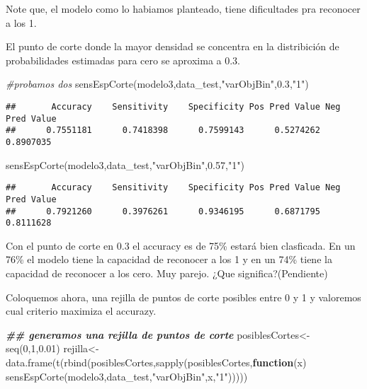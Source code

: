 \documentclass[
]{article}
\newenvironment{Shaded}{\begin{snugshade}}{\end{snugshade}}
\newcommand{\CommentTok}[1]{\textcolor[rgb]{0.56,0.35,0.01}{\textit{#1}}}
\newcommand{\ControlFlowTok}[1]{\textcolor[rgb]{0.13,0.29,0.53}{\textbf{#1}}}
\newcommand{\DecValTok}[1]{\textcolor[rgb]{0.00,0.00,0.81}{#1}}
\newcommand{\DocumentationTok}[1]{\textcolor[rgb]{0.56,0.35,0.01}{\textbf{\textit{#1}}}}
\newcommand{\FloatTok}[1]{\textcolor[rgb]{0.00,0.00,0.81}{#1}}
\newcommand{\FunctionTok}[1]{\textcolor[rgb]{0.00,0.00,0.00}{#1}}
\newcommand{\NormalTok}[1]{#1}
\newcommand{\OtherTok}[1]{\textcolor[rgb]{0.56,0.35,0.01}{#1}}
\newcommand{\StringTok}[1]{\textcolor[rgb]{0.31,0.60,0.02}{#1}}
\begin{document}
Note que, el modelo como lo habiamos planteado, tiene dificultades pra
reconocer a los 1.

El punto de corte donde la mayor densidad se concentra en la
distribición de probabilidades estimadas para cero se aproxima a 0.3.

\begin{Shaded}
\begin{Highlighting}[]
\CommentTok{\#probamos dos}
\FunctionTok{sensEspCorte}\NormalTok{(modelo3,data\_test,}\StringTok{"varObjBin"}\NormalTok{,}\FloatTok{0.3}\NormalTok{,}\StringTok{"1"}\NormalTok{)}
\end{Highlighting}
\end{Shaded}

\begin{verbatim}
##       Accuracy    Sensitivity    Specificity Pos Pred Value Neg Pred Value 
##      0.7551181      0.7418398      0.7599143      0.5274262      0.8907035
\end{verbatim}

\begin{Shaded}
\begin{Highlighting}[]
\FunctionTok{sensEspCorte}\NormalTok{(modelo3,data\_test,}\StringTok{"varObjBin"}\NormalTok{,}\FloatTok{0.57}\NormalTok{,}\StringTok{"1"}\NormalTok{)}
\end{Highlighting}
\end{Shaded}

\begin{verbatim}
##       Accuracy    Sensitivity    Specificity Pos Pred Value Neg Pred Value 
##      0.7921260      0.3976261      0.9346195      0.6871795      0.8111628
\end{verbatim}

Con el punto de corte en 0.3 el accuracy es de 75\% estará bien
clasficada. En un 76\% el modelo tiene la capacidad de reconocer a los 1
y en un 74\% tiene la capacidad de reconocer a los cero. Muy parejo.
¿Que significa?(Pendiente)

Coloquemos ahora, una rejilla de puntos de corte posibles entre 0 y 1 y
valoremos cual criterio maximiza el accurazy.

\begin{Shaded}
\begin{Highlighting}[]
\DocumentationTok{\#\# generamos una rejilla de puntos de corte}
\NormalTok{posiblesCortes}\OtherTok{\textless{}{-}}\FunctionTok{seq}\NormalTok{(}\DecValTok{0}\NormalTok{,}\DecValTok{1}\NormalTok{,}\FloatTok{0.01}\NormalTok{)}
\NormalTok{rejilla}\OtherTok{\textless{}{-}}\FunctionTok{data.frame}\NormalTok{(}\FunctionTok{t}\NormalTok{(}\FunctionTok{rbind}\NormalTok{(posiblesCortes,}\FunctionTok{sapply}\NormalTok{(posiblesCortes,}\ControlFlowTok{function}\NormalTok{(x) }
\FunctionTok{sensEspCorte}\NormalTok{(modelo3,data\_test,}\StringTok{"varObjBin"}\NormalTok{,x,}\StringTok{"1"}\NormalTok{)))))}
\end{Highlighting}
\end{Shaded}
\end{document}
